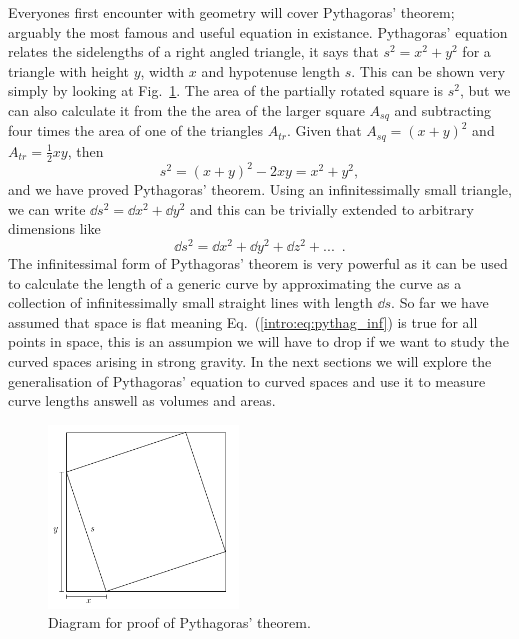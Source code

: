 Everyones first encounter with geometry will cover Pythagoras' theorem; arguably the most famous and useful equation in existance. Pythagoras' equation relates the sidelengths of a right angled triangle, it says that $s^2 = x^2 + y^2$ for a triangle with height $y$, width $x$ and hypotenuse length $s$. This can be shown very simply by looking at Fig.~\ref{intro:fig:pythag_proof}. The area of the partially rotated square is $s^2$, but we can also calculate it from the the area of the larger square $A_{sq}$ and subtracting four times the area of one of the triangles $A_{tr}$. Given that $A_{sq} = (x+y)^2$ and $A_{tr} = \frac{1}{2}xy$, then 
\begin{equation}
s^2 = (x+y)^2-2xy = x^2 + y^2,
\end{equation}
and we have proved Pythagoras' theorem. Using an infinitessimally small triangle, we can write $\dd s^2 = \dd x^2 + \dd y^2$ and this can be trivially extended to arbitrary dimensions like
\begin{equation}\label{intro:eq:pythag_inf}
\dd s^2 = \dd x^2 + \dd y^2 + \dd z^2 + ...\,\,\,.
\end{equation}
The infinitessimal form of Pythagoras' theorem is very powerful as it can be used to calculate the length of a generic curve by approximating the curve as a collection of infinitessimally small straight lines with length $\dd s$. So far we have assumed that space is flat meaning Eq.~(\ref{intro:eq:pythag_inf}) is true for all points in space, this is an assumpion we will have to drop if we want to study the curved spaces arising in strong gravity. In the next sections we will explore the generalisation of Pythagoras' equation to curved spaces and use it to measure curve lengths answell as volumes and areas.

\begin{figure}[h]
\centering
    \includegraphics[width=0.45\textwidth]{pics/pythag_proof2.png}
    \caption{Diagram for proof of Pythagoras' theorem.}
    \label{intro:fig:pythag_proof}
\end{figure}


